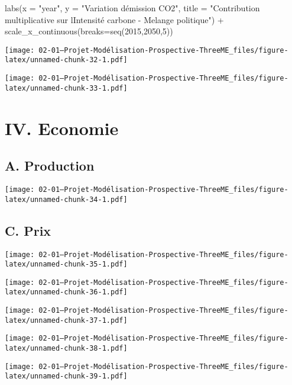\documentclass[
]{article}
\newenvironment{Shaded}{\begin{snugshade}}{\end{snugshade}}
\newcommand{\AttributeTok}[1]{\textcolor[rgb]{0.77,0.63,0.00}{#1}}
\newcommand{\DecValTok}[1]{\textcolor[rgb]{0.00,0.00,0.81}{#1}}
\newcommand{\FunctionTok}[1]{\textcolor[rgb]{0.00,0.00,0.00}{#1}}
\newcommand{\NormalTok}[1]{#1}
\newcommand{\SpecialCharTok}[1]{\textcolor[rgb]{0.00,0.00,0.00}{#1}}
\newcommand{\StringTok}[1]{\textcolor[rgb]{0.31,0.60,0.02}{#1}}
\begin{document}
\begin{Shaded}
\begin{Highlighting}[]
  \FunctionTok{labs}\NormalTok{(}\AttributeTok{x =} \StringTok{"year"}\NormalTok{, }\AttributeTok{y =} \StringTok{"Variation d\textquotesingle{}émission CO2"}\NormalTok{, }\AttributeTok{title =} \StringTok{"Contribution multiplicative sur l\textquotesingle{}Intensité carbone {-} Melange politique"}\NormalTok{) }\SpecialCharTok{+} 
  \FunctionTok{scale\_x\_continuous}\NormalTok{(}\AttributeTok{breaks=}\FunctionTok{seq}\NormalTok{(}\DecValTok{2015}\NormalTok{,}\DecValTok{2050}\NormalTok{,}\DecValTok{5}\NormalTok{))}
\end{Highlighting}
\end{Shaded}

\texttt{[image: 02-01---Projet-Modélisation-Prospective-ThreeME\_files/figure-latex/unnamed-chunk-32-1.pdf]}

\texttt{[image: 02-01---Projet-Modélisation-Prospective-ThreeME\_files/figure-latex/unnamed-chunk-33-1.pdf]}

\hypertarget{iv.-economie}{%
\section{IV. Economie}\label{iv.-economie}}

\hypertarget{a.-production}{%
\subsection{A. Production}\label{a.-production}}

\texttt{[image: 02-01---Projet-Modélisation-Prospective-ThreeME\_files/figure-latex/unnamed-chunk-34-1.pdf]}

\hypertarget{c.-prix}{%
\subsection{C. Prix}\label{c.-prix}}

\texttt{[image: 02-01---Projet-Modélisation-Prospective-ThreeME\_files/figure-latex/unnamed-chunk-35-1.pdf]}

\texttt{[image: 02-01---Projet-Modélisation-Prospective-ThreeME\_files/figure-latex/unnamed-chunk-36-1.pdf]}

\texttt{[image: 02-01---Projet-Modélisation-Prospective-ThreeME\_files/figure-latex/unnamed-chunk-37-1.pdf]}

\texttt{[image: 02-01---Projet-Modélisation-Prospective-ThreeME\_files/figure-latex/unnamed-chunk-38-1.pdf]}

\texttt{[image: 02-01---Projet-Modélisation-Prospective-ThreeME\_files/figure-latex/unnamed-chunk-39-1.pdf]}
\end{document}
